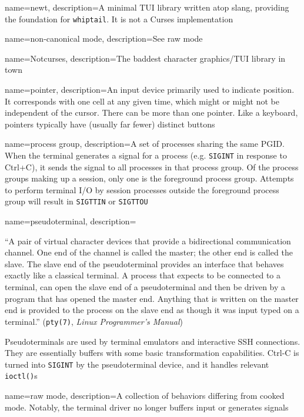 {
  name={newt},
description={A minimal TUI library written atop slang, providing the foundation
  for \texttt{whiptail}. It is not a Curses implementation}
}

{
  name={non-canonical mode},
description={See \gls{raw mode}}
}

{
  name={Notcurses},
description={The baddest character graphics/TUI library in town}
}

{
  name={pointer},
description={An input device primarily used to indicate position. It
  corresponds with one cell at any given time, which might or might not be
  independent of the cursor. There can be more than one pointer. Like a
  keyboard, pointers typically have (usually far fewer) distinct buttons}
}

{
  name={process group},
description={A set of processes sharing the same PGID. When the terminal
  generates a signal for a process (e.g. \texttt{SIGINT} in response to Ctrl+C), it
  sends the signal to all processes in that process group. Of the process
  groups making up a session, only one is the foreground process group.
  Attempts to perform terminal I/O by session processes outside the foreground
  process group will result in \texttt{SIGTTIN} or \texttt{SIGTTOU}}
}

{
  name={pseudoterminal},
description={``A pair of virtual character devices that provide a
  bidirectional communication channel. One end of the channel is called the
  master; the other end is called the slave. The slave end of the
  pseudoterminal provides an interface that behaves exactly like a classical
  terminal. A process that expects to be connected to a terminal, can open
  the slave end of a pseudoterminal and then be driven by a program that has
  opened the master end. Anything that is written on the master end is
  provided to the process on the slave end as though it was input typed on a
  terminal.'' (\texttt{pty(7)}, \textit{Linux Programmer's Manual})

 Pseudoterminals are used by terminal emulators and interactive SSH
  connections. They are essentially buffers with some basic transformation
  capabilities. Ctrl-C is turned into \texttt{SIGINT} by the pseudoterminal device,
  and it handles relevant \texttt{ioctl()}s}
}

{
  name={raw mode},
description={A collection of behaviors differing from \gls{cooked mode}. Notably,
  the terminal driver no longer buffers input or generates signals}
}

